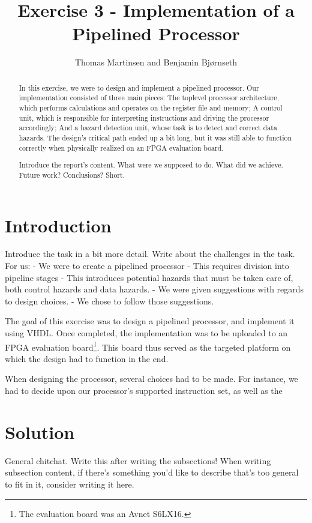 \documentclass[11pt]{article}
\title{Exercise 3 - Implementation of a Pipelined Processor}
\author{Thomas Martinsen and Benjamin Bj\o rnseth}
\begin{document}
\maketitle

\begin{abstract}
  In this exercise, we were to design and implement a pipelined
  processor. Our implementation consisted of three main pieces: The
  toplevel processor architecture, which performs calculations and
  operates on the register file and memory; A control unit, which is
  responsible for interpreting instructions and driving the processor
  accordingly; And a hazard detection unit, whose task is to detect
  and correct data hazards. The design's critical path ended up a bit
  long, but it was still able to function correctly when physically
  realized on an FPGA evaluation board.

  Introduce the report's content. What were we supposed to do. What
  did we achieve. Future work? Conclusions? Short.
\end{abstract}

\section{Introduction}
\label{sec:introduction}
Introduce the task in a bit more detail. Write about the challenges in
the task. For us:
 - We were to create a pipelined processor
 - This requires division into pipeline stages 
 - This introduces potential hazards that must be taken care of, both control hazards and data
hazards.  
- We were given suggestions with regards to design choices.
- We chose to follow those suggestions.

The goal of this exercise was to design a pipelined processor, and
implement it using VHDL. Once completed, the implementation was to be
uploaded to an FPGA evaluation board\footnote{The evaluation board was
  an Avnet S6LX16.}. This board thus served as the targeted platform
on which the design had to function in the end. 

When designing the processor, several choices had to be made. For
instance, we had to decide upon our processor's supported instruction
set, as well as the 

\section{Solution}
\label{sec:solution} General chitchat. Write this after writing the
subsections!  When writing subsection content, if there's something
you'd like to describe that's too general to fit in it, consider
writing it here.
\end{document}
